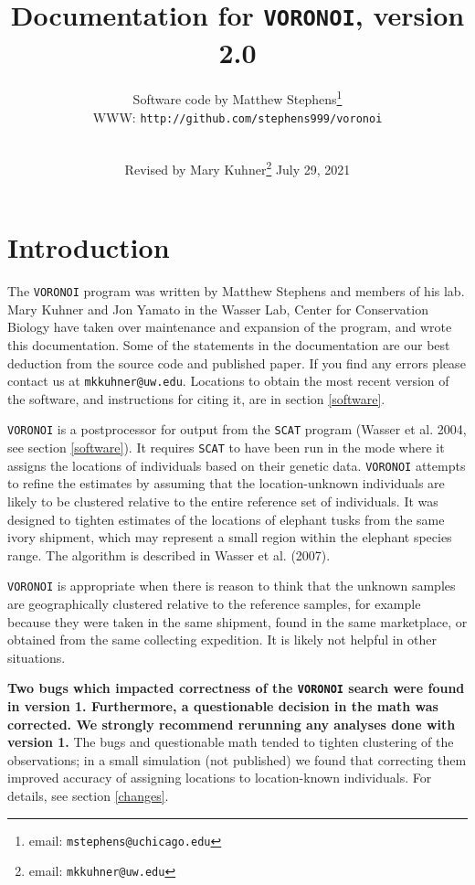\documentclass[10pt,titlepage,times,letterpaper]{article}
\def\SCAT{{\tt SCAT} }
\def\VORONOI{{\tt VORONOI} }
\begin{document}
\title{Documentation for {\tt VORONOI}, version 2.0}

\author{
Software code by Matthew Stephens\footnote{email: {\tt mstephens@uchicago.edu}} \\
WWW: {\tt http://github.com/stephens999/voronoi}\\
\\
}

\date{Revised by Mary Kuhner\footnote{email:  {\tt mkkuhner@uw.edu}} July 29, 2021}


\maketitle

\tableofcontents
\vfil\eject
\section{Introduction}
The \VORONOI program was written by Matthew Stephens and members of his lab.  Mary Kuhner
and Jon Yamato in the Wasser Lab, Center for Conservation Biology
have taken over maintenance and expansion of the program, and wrote this documentation.
Some of the statements in the documentation are our best deduction from the source code
and published paper.  If you find any errors please contact us at {\tt mkkuhner@uw.edu}.
Locations to obtain the most recent version of the software, and instructions for citing
it, are in section \ref{software}.

\VORONOI is a postprocessor for output from the \SCAT program (Wasser et al. 2004, see
section \ref{software}).
It requires \SCAT to have been run in the mode where
it assigns the locations of individuals based on their genetic data.  \VORONOI attempts
to refine the estimates by assuming that the location-unknown individuals are likely to
be clustered relative to the entire reference set of individuals.  It was designed to
tighten estimates of the locations of elephant tusks from the same ivory shipment, which
may represent a small region within the elephant species range.  The algorithm is
described in Wasser et al. (2007).

\VORONOI is appropriate when there is reason to think that the unknown samples are
geographically clustered relative to the reference samples, for example
because they were taken in the same shipment, found in the same marketplace, or
obtained from the same collecting expedition.  It is likely not helpful in other
situations.

{\bf Two bugs which impacted correctness of the \VORONOI search were found in version 1.
Furthermore, a questionable decision in the math was corrected.
We strongly recommend rerunning any analyses done with version 1.}  The bugs and
questionable math tended to tighten clustering of the observations; in a small
simulation (not published) we found that correcting them improved accuracy of
assigning locations to location-known individuals.  For details, see section \ref{changes}.
\end{document}
